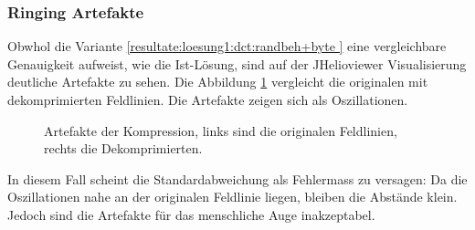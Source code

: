 \subsubsection{Ringing Artefakte}\label{resultate:loesung1:ringing}
Obwhol die Variante \ref{resultate:loesung1:dct:randbeh+byte } eine vergleichbare Genauigkeit aufweist, wie die Ist-Lösung, sind auf der JHelioviewer Visualisierung deutliche Artefakte zu sehen. Die Abbildung \ref{resultate:loesung1:dct:randbehandlung:jvhartefakte} vergleicht die originalen mit dekomprimierten Feldlinien. Die Artefakte zeigen sich als Oszillationen.
\begin{figure}[!htbp]
	\center
	\caption{Artefakte der Kompression, links sind die originalen Feldlinien, rechts die Dekomprimierten.}
	\label{resultate:loesung1:dct:randbehandlung:jvhartefakte}
\end{figure} 
In diesem Fall scheint die Standardabweichung als Fehlermass zu versagen: Da die Oszillationen nahe an der originalen Feldlinie liegen, bleiben die Abstände klein. Jedoch sind die Artefakte für das menschliche Auge inakzeptabel.\\
